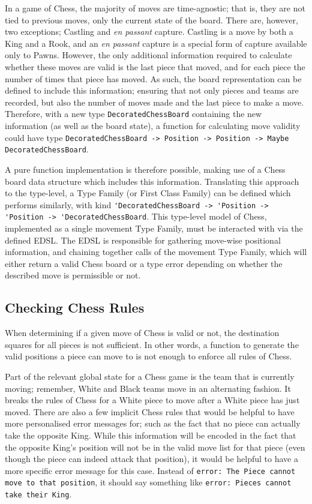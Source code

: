 \documentclass[12pt, a4paper, bibliography=totocnumbered]{scrreprt}
\newcommand{\inline}[1]{\lstinline[basicstyle=\ttfamily\footnotesize]{#1}}
\begin{document}
In a game of Chess, the majority of moves are time-agnostic; that is, they are not tied to previous moves, only the current state of the board. There are, however, two exceptions; Castling and \emph{en passant} capture. Castling is a move by both a King and a Rook, and an \emph{en passant} capture is a special form of capture available only to Pawns. However, the only additional information required to calculate whether these moves are valid is the last piece that moved, and for each piece the number of times that piece has moved. As such, the board representation can be defined to include this information; ensuring that not only pieces and teams are recorded, but also the number of moves made and the last piece to make a move. Therefore, with a new type \inline{DecoratedChessBoard} containing the new information (as well as the board state), a function for calculating move validity could have type \inline{DecoratedChessBoard -> Position -> Position -> Maybe DecoratedChessBoard}.

A pure function implementation is therefore possible, making use of a Chess board data structure which includes this information. Translating this approach to the type-level, a Type Family (or First Class Family) can be defined which performs similarly, with kind \inline{'DecoratedChessBoard -> 'Position -> 'Position -> 'DecoratedChessBoard}. This type-level model of Chess, implemented as a single movement Type Family, must be interacted with via the defined EDSL. The EDSL is responsible for gathering move-wise positional information, and chaining together calls of the movement Type Family, which will either return a valid Chess board or a type error depending on whether the described move is permissible or not.

\subsection{Checking Chess Rules} \label{chessrules}

When determining if a given move of Chess is valid or not, the destination squares for all pieces is not sufficient. In other words, a function to generate the valid positions a piece can move to is not enough to enforce all rules of Chess.

Part of the relevant global state for a Chess game is the team that is currently moving; remember, White and Black teams move in an alternating fashion. It breaks the rules of Chess for a White piece to move after a White piece has just moved. There are also a few implicit Chess rules that would be helpful to have more personalised error messages for; such as the fact that no piece can actually take the opposite King. While this information will be encoded in the fact that the opposite King's position will not be in the valid move list for that piece (even though the piece can indeed attack that position), it would be helpful to have a more specific error message for this case. Instead of \inline{error: The Piece cannot move to that position}, it should say something like \inline{error: Pieces cannot take their King}.
\end{document}
